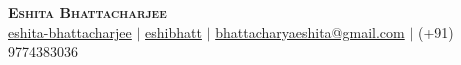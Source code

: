 \documentclass[a4,10.9pt]{article}
\begin{document}
\begin{center}

        \textbf{\Huge \scshape Eshita Bhattacharjee} \\ \vspace{1pt}
    \faLinkedin \hspace{1pt} \href{https://www.linkedin.com/in/eshita-bhattacharjee/}{eshita-bhattacharjee} 
    \hspace{1pt} $|$ \hspace{1pt} \faGithub \hspace{1pt}
    \href{https://github.com/eshibhatt}{eshibhatt} 
    \hspace{1pt} $|$ \hspace{1pt} \faEnvelope \hspace{1pt}
    \href{mailto:bhattacharyaeshita@gmail.com}{bhattacharyaeshita@gmail.com}\hspace{1pt}
     $|$ \hspace{1pt} \faPhone \hspace{1pt}
    \small (+91) 9774383036
    
\end{center}
\end{document}

